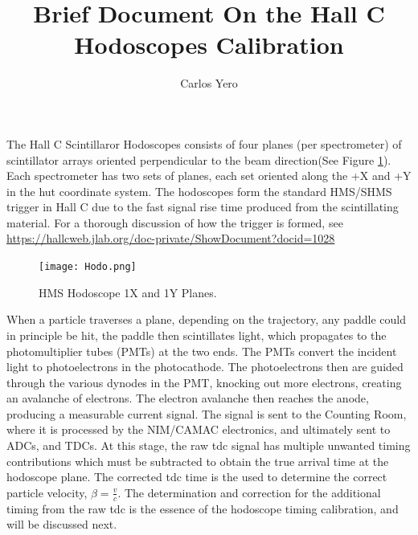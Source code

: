 \documentclass[14pt]{article}
\begin{document}
 
 
\title{\textbf{Brief Document On the Hall C Hodoscopes Calibration}}%
\author{Carlos Yero} %
 
\maketitle
\noindent The Hall C Scintillaror Hodoscopes consists of four planes (per spectrometer) of scintillator arrays oriented perpendicular
to the beam direction(See Figure \ref{fig:Hodo}). Each spectrometer has two sets of planes, each set oriented along the +X and +Y in the hut coordinate system.
The hodoscopes form the standard HMS/SHMS trigger in Hall C due to the fast signal rise time produced from the scintillating material.
For a thorough discussion of how the trigger is formed, see \url{https://hallcweb.jlab.org/doc-private/ShowDocument?docid=1028}  \\
\begin{figure}[H]
  \captionsetup{justification=raggedright,singlelinecheck=false}
  \texttt{[image: Hodo.png]}
  \caption{HMS Hodoscope 1X and 1Y Planes.}
  \label{fig:Hodo}
\end{figure}
When a particle traverses a plane, depending on the trajectory, any paddle could in principle be hit,
the paddle then scintillates light, which propagates to the photomultiplier tubes (PMTs) at the two ends. The PMTs
convert the incident light to photoelectrons in the photocathode. The photoelectrons then are guided through the various dynodes in the PMT, knocking
out more electrons, creating an avalanche of electrons. The electron avalanche then reaches the anode, producing a measurable current signal.
The signal is sent to the Counting Room, where it is processed by the NIM/CAMAC electronics, and ultimately sent to ADCs, and TDCs. At this stage, the raw tdc signal
has multiple unwanted timing contributions which must be subtracted to obtain the true arrival time at the hodoscope plane. The corrected tdc time is the used to determine
the correct particle velocity, $\beta = \frac{v}{c}$. The determination and correction for the additional timing from the raw tdc is the essence of the hodoscope timing
calibration, and will be discussed next.
\end{document}
